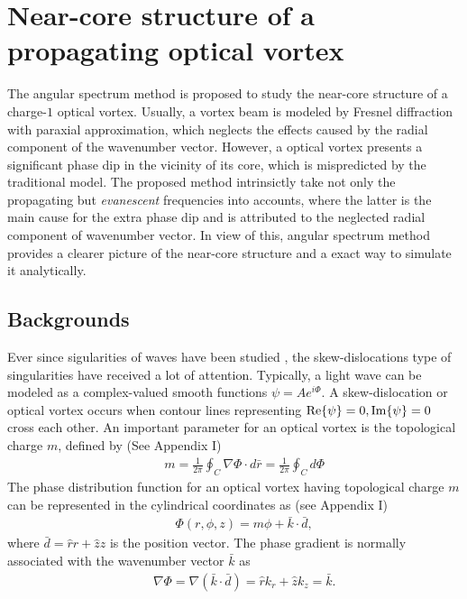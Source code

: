 \section{Near-core structure of a propagating optical vortex \cite{Near16}}
\label{sec:angular_spectrum}
The angular spectrum method is proposed to study the near-core structure of a charge-$1$ optical vortex. Usually, a vortex beam is modeled by Fresnel diffraction  with paraxial approximation, which neglects the effects caused by the radial component of the wavenumber vector. However, a optical vortex presents a significant phase dip in the vicinity of its core, which is mispredicted by the traditional model. The proposed method intrinsictly take not only the propagating but {\em evanescent} frequencies into accounts, where the latter is the main cause for the extra phase dip and is attributed to the neglected radial component of wavenumber vector. In view of this, angular spectrum method provides a clearer picture of the near-core structure and a exact way to simulate it analytically.

\subsection{Backgrounds}
Ever since sigularities of waves have been studied \cite{Ber73}, the skew-dislocations type of singularities have received a lot of attention. 
Typically, a light wave can be modeled as a complex-valued smooth functions $\psi = A e^{i \Phi}$. 
A skew-dislocation or optical vortex occurs when contour lines representing ${\rm Re} \{ \psi \} = 0, {\rm Im} \{ \psi \} = 0$ 
cross each other. 
An important parameter for an optical vortex is the topological charge $m$, defined by (See Appendix I)
\begin{eqnarray}
	&&m = \frac{1}{2\pi} \oint_C \nabla \Phi \cdot d\bar{r} = \frac{1}{2\pi} \oint_C d\Phi
\end{eqnarray}
The phase distribution function for an optical vortex having topological charge $m$ can be represented in the cylindrical coordinates as
(see Appendix I)
\begin{eqnarray}
	&&\Phi(r, \phi, z) = m \phi + \bar{k} \cdot \bar{d},
	\label{eq:phase}
\end{eqnarray}
where $\bar{d} = \hat{r} r + \hat{z} z$ is the position vector. The phase gradient is normally associated with the wavenumber vector $\bar{k}$ as
\begin{eqnarray}
	&&\nabla \Phi = \nabla (\bar{k} \cdot \bar{d}) = \hat{r} k_{r} + \hat{z} k_z = \bar{k}.
\end{eqnarray}

